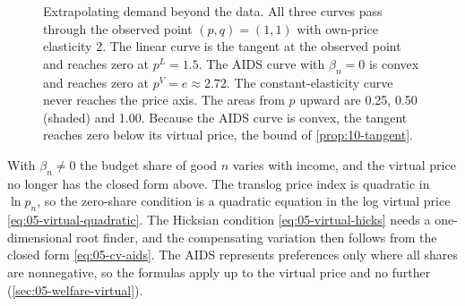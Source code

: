 \begin{figure}[htbp]
\centering
{}
\caption{Extrapolating demand beyond the data. All three curves pass through the observed point $(p,q) = (1,1)$
with own-price elasticity 2. The linear curve is the tangent at the observed point and reaches zero at
$p^L = 1.5$. The AIDS curve with $\beta_n = 0$ is convex and reaches zero at $p^V = e \approx 2.72$. The
constant-elasticity curve never reaches the price axis. The areas from $p$ upward are 0.25, 0.50 (shaded) and
1.00. Because the AIDS curve is convex, the tangent reaches zero below its virtual price, the bound of
\cref{prop:10-tangent}.}
\label{fig:10-extrapolation}
\end{figure}

With $\beta_n \neq 0$ the budget share of good $n$ varies with income, and the virtual price no longer has the closed form above.
The translog price index is quadratic in $\ln p_n$, so the zero-share condition is a quadratic equation in the
log virtual price \eqref{eq:05-virtual-quadratic}. The Hicksian condition \eqref{eq:05-virtual-hicks} needs a
one-dimensional root finder, and the compensating variation then follows from the closed form
\eqref{eq:05-cv-aids}. The AIDS represents preferences only where all shares are nonnegative, so the formulas
apply up to the virtual price and no further (\cref{sec:05-welfare-virtual}).

